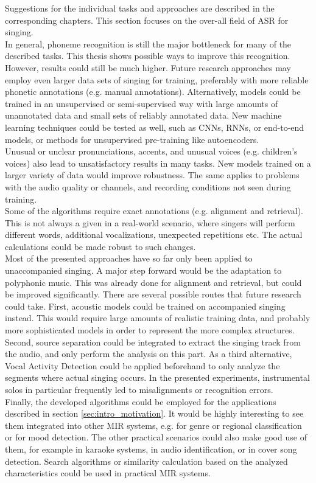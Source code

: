 Suggestions for the individual tasks and approaches are described in the corresponding chapters. This section focuses on the over-all field of ASR for singing.\\
In general, phoneme recognition is still the major bottleneck for many of the described tasks. This thesis shows possible ways to improve this recognition. However, results could still be much higher. Future research approaches may employ even larger data sets of singing for training, preferably with more reliable phonetic annotations (e.g. manual annotations). Alternatively, models could be trained in an unsupervised or semi-supervised way with large amounts of unannotated data and small sets of reliably annotated data. New machine learning techniques could be tested as well, such as CNNs, RNNs, or end-to-end models, or methods for unsupervised pre-training like autoencoders.\\
Unusual or unclear pronunciations, accents, and unusual voices (e.g. children's voices) also lead to unsatisfactory results in many tasks. New models trained on a larger variety of data would improve robustness. The same applies to problems with the audio quality or channels, and recording conditions not seen during training.\\

Some of the algorithms require exact annotations (e.g. alignment and retrieval). This is not always a given in a real-world scenario, where singers will perform different words, additional vocalizations, unexpected repetitions etc. The actual calculations could be made robust to such changes.\\

Most of the presented approaches have so far only been applied to unaccompanied singing. A major step forward would be the adaptation to polyphonic music. This was already done for alignment and retrieval, but could be improved significantly. There are several possible routes that future research could take. First, acoustic models could be trained on accompanied singing instead. This would require large amounts of realistic training data, and probably more sophisticated models in order to represent the more complex structures. Second, source separation could be integrated to extract the singing track from the audio, and only perform the analysis on this part. As a third alternative, Vocal Activity Detection could be applied beforehand to only analyze the segments where actual singing occurs. In the presented experiments, instrumental solos in particular frequently led to misalignments or recognition errors.\\

Finally, the developed algorithms could be employed for the applications described in section \ref{sec:intro_motivation}. It would be highly interesting to see them integrated into other MIR systems, e.g. for genre or regional classification or for mood detection. The other practical scenarios could also make good use of them, for example in karaoke systems, in audio identification, or in cover song detection. Search algorithms or similarity calculation based on the analyzed characteristics could be used in practical MIR systems.
